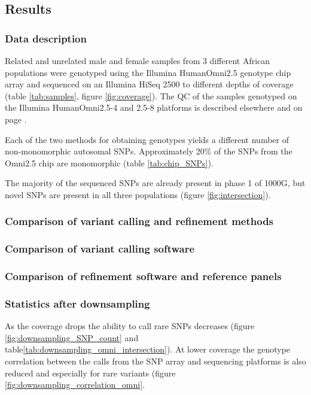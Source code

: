 \subsection{Results}

\subsubsection{Data description}
\label{sec:agv_data_description}
Related and unrelated male and female samples from 3 different African populations were genotyped using the Illumina HumanOmni2.5 genotype chip array and sequenced on an Illumina HiSeq 2500 to different depths of coverage (table \ref{tab:samples}, figure \ref{fig:coverage}). The \gls{QC} of the samples genotyped on the Illumina HumanOmni2.5-4 and 2.5-8 platforms is described elsewhere\cite{Gurdasani2015} and on page \pageref{subsec:chipQC}.

Each of the two methods for obtaining genotypes yields a different number of non-monomorphic autosomal SNPs. Approximately 20\% of the SNPs from the Omni2.5 chip are monomorphic (table \ref{tab:chip_SNPs}).

The majority of the sequenced \glspl{SNP} are already present in phase 1 of \gls{1000G}\cite{1000G2012}, but novel SNPs are present in all three populations (figure \ref{fig:intersection}).

\subsubsection{Comparison of variant calling and refinement methods}
\subsubsection{Comparison of variant calling software}
\subsubsection{Comparison of refinement software and reference panels}

\subsubsection{Statistics after downsampling}

As the coverage drops the ability to call rare \glspl{SNP} decreases (figure \ref{fig:downsampling_SNP_count} and table\ref{tab:downsampling_omni_intersection}). At lower coverage the genotype correlation between the calls from the SNP array and sequencing platforms is also reduced and especially for rare variants (figure \ref{fig:downsampling_correlation_omni}.

